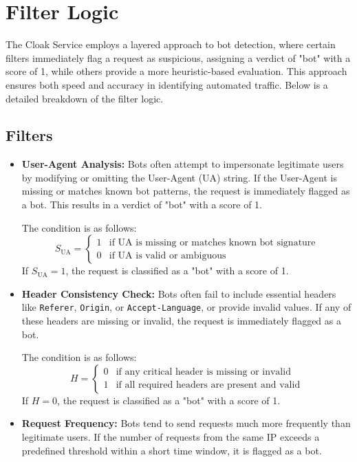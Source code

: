 \documentclass[12pt,a4paper]{article}
\begin{document}
\newpage
\section{Filter Logic}

The Cloak Service employs a layered approach to bot detection, where certain filters immediately flag a request as suspicious, assigning a verdict of "bot" with a score of 1, while others provide a more heuristic-based evaluation. This approach ensures both speed and accuracy in identifying automated traffic. Below is a detailed breakdown of the filter logic.

\subsection{Filters}

\begin{itemize}
  \item \textbf{User-Agent Analysis:} 
  Bots often attempt to impersonate legitimate users by modifying or omitting the User-Agent (UA) string. If the User-Agent is missing or matches known bot patterns, the request is immediately flagged as a bot. This results in a verdict of "bot" with a score of 1.

  The condition is as follows:
  \[
  S_{\text{UA}} = 
  \begin{cases} 
    1 & \text{if UA is missing or matches known bot signature} \\
    0 & \text{if UA is valid or ambiguous}
  \end{cases}
  \]
  If \( S_{\text{UA}} = 1 \), the request is classified as a "bot" with a score of 1.

  \item \textbf{Header Consistency Check:} 
  Bots often fail to include essential headers like \texttt{Referer}, \texttt{Origin}, or \texttt{Accept-Language}, or provide invalid values. If any of these headers are missing or invalid, the request is immediately flagged as a bot.

  The condition is as follows:
  \[
  H = 
  \begin{cases}
    0 & \text{if any critical header is missing or invalid} \\
    1 & \text{if all required headers are present and valid}
  \end{cases}
  \]
  If \( H = 0 \), the request is classified as a "bot" with a score of 1.

  \item \textbf{Request Frequency:} 
  Bots tend to send requests much more frequently than legitimate users. If the number of requests from the same IP exceeds a predefined threshold within a short time window, it is flagged as a bot.


\end{itemize}
\end{document}
